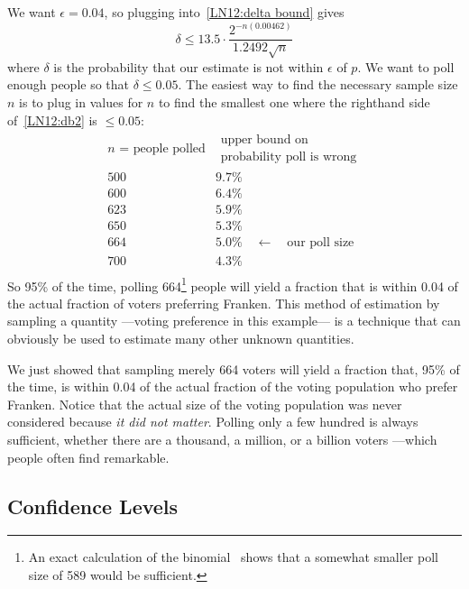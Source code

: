 We want $\epsilon = 0.04$, so plugging into~\eqref{LN12:delta bound} gives 
\begin{equation}\label{LN12:db2}
\delta \leq 13.5 \cdot \frac{2^{-n(0.00462)}}{1.2492 \sqrt{n}}
\end{equation}
where $\delta$ is the probability that our estimate is not within
$\epsilon$ of $p$.  We want to poll enough people so that $\delta \leq
0.05$.  The easiest way to find the necessary sample size $n$ is to plug
in values for $n$ to find the smallest one where the righthand side
of~\eqref{LN12:db2} is $ \leq 0.05$:
\[
\begin{array}{c|l}
\mbox{$n$ = people polled} & \begin{array}{cc}
\mbox{upper bound on} \\
\mbox{probability poll is wrong}
\end{array} \\
\hline
500 &  9.7\% \\
600 &  6.4\% \\
623 &  5.9\% \\
650 &  5.3\% \\
664 &  5.0\% \quad \leftarrow \quad \mbox{our poll size} \\
700 &  4.3\% \\
\end{array}
\]
So 95\% of the time, polling 664\footnote{An exact calculation of the
binomial \cdf\ shows that a somewhat smaller poll size of 589 would be
sufficient.}  people will yield a fraction that is within 0.04 of the
actual fraction of voters preferring Franken.  This method of estimation
by sampling a quantity ---voting preference in this example--- is a
technique that can obviously be used to estimate many other unknown
quantities.

We just showed that sampling merely 664 voters will yield a fraction that,
95\% of the time, is within 0.04 of the actual fraction of the voting
population who prefer Franken.  Notice that the actual size of the voting
population was never considered because \emph{it did not matter}.  Polling
only a few hundred is always sufficient, whether there are a thousand, a
million, or a billion voters ---which people often find remarkable.


\subsection{Confidence Levels}

